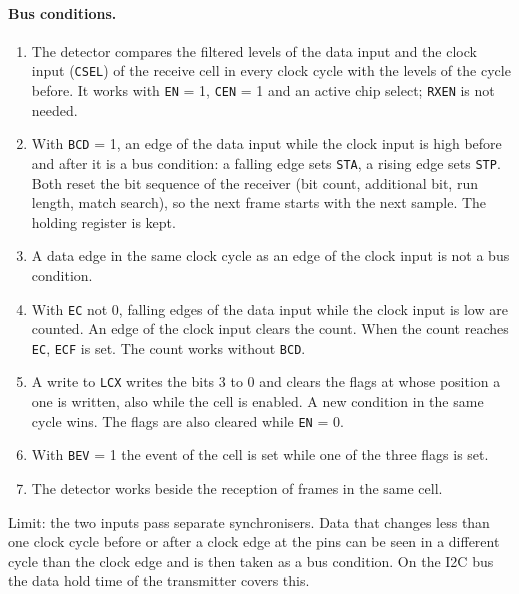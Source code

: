 \documentclass[10pt,a4paper]{article}
\newcommand{\reg}[1]{\texttt{#1}}
\begin{document}
\paragraph{Bus conditions.}
\begin{enumerate}[label=\textbf{B\arabic*},leftmargin=2.6em]
\item The detector compares the filtered levels of the data input and the clock input (\reg{CSEL}) of the
receive cell in every clock cycle with the levels of the cycle before. It works with \reg{EN} = 1,
\reg{CEN} = 1 and an active chip select; \reg{RXEN} is not needed.
\item With \reg{BCD} = 1, an edge of the data input while the clock input is high before and after it is a bus
condition: a falling edge sets \reg{STA}, a rising edge sets \reg{STP}. Both reset the bit sequence of the
receiver (bit count, additional bit, run length, match search), so the next frame starts with the next sample.
The holding register is kept.
\item A data edge in the same clock cycle as an edge of the clock input is not a bus condition.
\item With \reg{EC} not 0, falling edges of the data input while the clock input is low are counted. An edge of
the clock input clears the count. When the count reaches \reg{EC}, \reg{ECF} is set. The count works without
\reg{BCD}.
\item A write to \reg{LCX} writes the bits 3 to 0 and clears the flags at whose position a one is written, also
while the cell is enabled. A new condition in the same cycle wins. The flags are also cleared while \reg{EN} = 0.
\item With \reg{BEV} = 1 the event of the cell is set while one of the three flags is set.
\item The detector works beside the reception of frames in the same cell.
\end{enumerate}
Limit: the two inputs pass separate synchronisers. Data that changes less than one clock cycle before or
after a clock edge at the pins can be seen in a different cycle than the clock edge and is then taken as a bus
condition. On the I2C bus the data hold time of the transmitter covers this.
\end{document}
